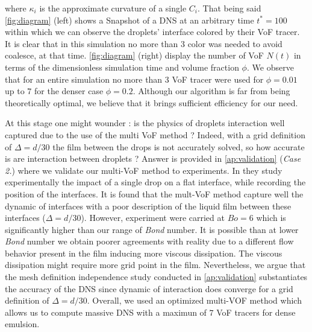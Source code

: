 where $\kappa_i$ is the approximate curvature of a single $C_i$. 
That being said 
\ref{fig:diagram} (left) shows a Snapshot of a DNS at an arbitrary time $t^* = 100$ within which we can observe the droplets' interface colored by their VoF tracer. 
It is clear that in this simulation no more than 3 color was needed to avoid coalesce, at that time.
\ref{fig:diagram} (right) display the number of VoF $N(t)$ in terms of the dimensionless simulation time and volume fraction $\phi$. 
We observe that for an entire simulation no more than 3 VoF tracer were used for $\phi = 0.01$ up to $7$ for the denser case $\phi = 0.2$. 
Although our algorithm is far from being theoretically optimal, we believe that it brings sufficient efficiency for our need. 

At this stage one might wounder : is the physics of droplets interaction well captured due to the use of the multi VoF method ?
Indeed, with a grid definition of $\Delta = d/30$ the film between the drops is not accurately solved, so how accurate is are interaction between droplets ?
Answer is  provided in \ref{ap:validation} (\textit{Case 2.}) where we validate our multi-VoF method to \citet{mohamed2003drop} experiments.
In \citet{mohamed2003drop} they study experimentally the impact of a single drop on a flat interface, while recording the position of the interfaces. 
It is found that the mult-VoF method capture well the dynamic of interfaces with a poor description of the liquid film between these interfaces ($\Delta = d/30$). 
However,  \citet{mohamed2003drop} experiment were carried at $Bo = 6$ which is significantly higher than our range of \textit{Bond} number. 
It is possible than at lower \textit{Bond} number we obtain poorer agreements with reality due to a different flow behavior present in the film inducing more viscous dissipation.
The viscous dissipation might require more grid point in the film. 
Nevertheless, we argue that the mesh definition independence study conducted in \ref{ap:validation} substantiates the accuracy of the DNS since dynamic of interaction does converge for a grid definition of $\Delta = d/30$. 
Overall, we used an optimized multi-VOF method which allows us to compute massive DNS with a maximun of $7$ VoF tracers for dense emulsion.
 





